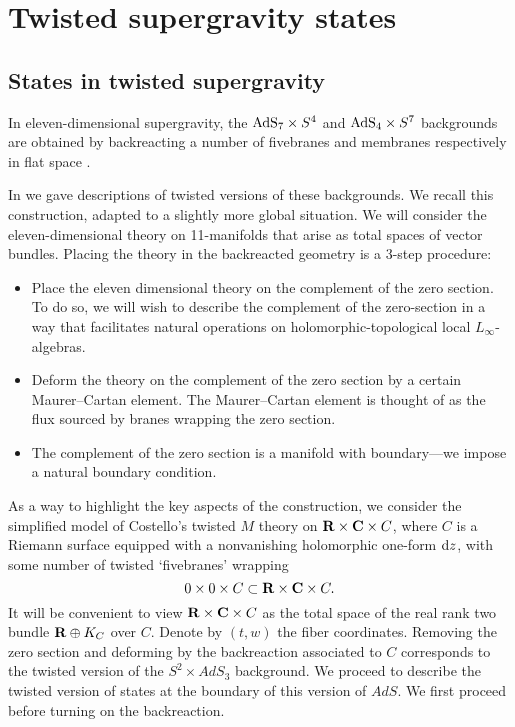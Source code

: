 \documentclass[11pt]{amsart}
\begin{document}
\section{Twisted supergravity states}

\subsection{States in twisted supergravity}

In eleven-dimensional supergravity, the ${\rm AdS}_7 \times S^4$ and ${\rm AdS}_{4}\times S^{7}$ backgrounds are obtained by backreacting a number of fivebranes and membranes respectively in flat space .

In \cite{RSW} we gave descriptions of twisted versions of these backgrounds. We recall this construction, adapted to a slightly more global situation. We will consider the eleven-dimensional theory on 11-manifolds that arise as total spaces of vector bundles. Placing the theory in the backreacted geometry is a 3-step procedure:

\begin{itemize}
  \item Place the eleven dimensional theory on the complement of the zero section. To do so, we will wish to describe the complement of the zero-section in a way that facilitates natural operations on holomorphic-topological local $L_{\infty}$-algebras.

  \item Deform the theory on the complement of the zero section by a certain Maurer--Cartan element.
  The Maurer--Cartan element is thought of as the flux sourced by branes wrapping the zero section.

  \item The complement of the zero section is a manifold with boundary---we impose a natural boundary condition.

\end{itemize}

\parsec[s:brkevin]

As a way to highlight the key aspects of the construction, we consider the simplified model of Costello's twisted $M$ theory on $\mathbf{R} \times \mathbf{C} \times C$, where $C$ is a Riemann surface equipped with a nonvanishing holomorphic one-form ${\rm d} z$, with some number of twisted `fivebranes' wrapping
\[
0 \times 0 \times C \subset \mathbf{R} \times \mathbf{C} \times C .
\]
It will be convenient to view $\mathbf{R} \times \mathbf{C} \times C$ as the total space of the real rank two bundle $\mathbf{R} \oplus K_C$ over $C$.
Denote by $(t,w)$ the fiber coordinates.
Removing the zero section and deforming by the backreaction associated to $C$ corresponds to the twisted version of the $S^2 \times AdS_3$ background.
We proceed to describe the twisted version of states at the boundary of this version of $AdS$.
We first proceed before turning on the backreaction.
\end{document}
